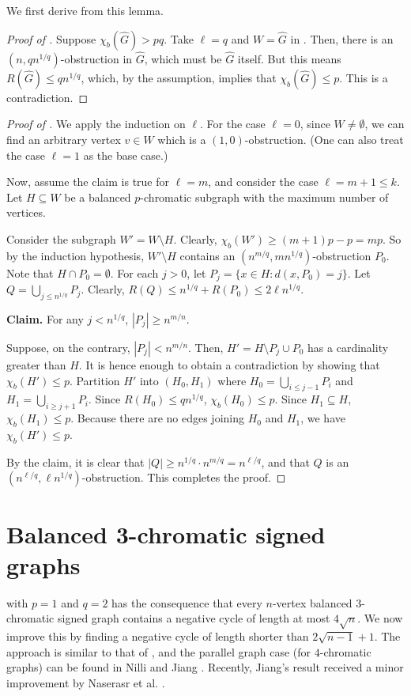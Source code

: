 \documentclass{article}
\begin{document}
We first derive  from this lemma.
\begin{proof}[Proof of ]
    Suppose $\chi_b(\widehat{G})>pq$. Take $\ell=q$ and $W=\widehat{G}$ in . Then, there is an $(n,qn^{1/q})$-obstruction in $\widehat{G}$, which must be $\widehat{G}$ itself. But this means $R(\widehat{G})\leq qn^{1/q}$, which, by the assumption, implies that $\chi_b(\widehat{G})\leq p$. This is a contradiction.
\end{proof}
\begin{proof}[Proof of ]
    We apply the induction on $\ell$. For the case $\ell=0$, since $W\neq \emptyset$, we can find an arbitrary vertex $v\in W$ which is a $(1,0)$-obstruction. (One can also treat the case $\ell =1$ as the base case.)

    Now, assume the claim is true for $\ell=m$, and consider the case $\ell=m+1\leq k$. Let $H\subseteq W$ be a balanced $p$-chromatic subgraph with the maximum number of vertices. %

    Consider the subgraph $W'=W\setminus H$. Clearly, $\chi_b(W')\geq (m+1)p-p=mp$. So by the induction hypothesis, $W'\setminus H$ contains an $(n^{m/q},mn^{1/q})$-obstruction $P_0$. Note that $H\cap P_0=\emptyset$. For each $j>0$, let $P_j=\{x\in H: d(x,P_0)=j\}$. Let $Q=\bigcup_{j\leq n^{1/q}}P_j$. Clearly, $R(Q)\leq n^{1/q}+R(P_0)\leq 2\ell n^{1/q}.$

    \textbf{Claim.} For any $j< n^{1/q}$, $|P_j|\geq n^{m/n}$. 

    Suppose, on the contrary, $|P_j|< n^{m/n}$. Then, $H'=H\setminus P_j\cup P_0$ has a cardinality greater than $H$. It is hence enough to obtain a contradiction by showing that $\chi_b(H')\leq p$. Partition $H'$ into $(H_0,H_1)$ where $H_0=\bigcup_{i\leq j-1}P_i$ and $H_1=\bigcup_{i\geq j+1}P_i$. Since $R(H_0)\leq qn^{1/q}$, $\chi_b(H_0)\leq p$. Since $H_1\subseteq H$, $\chi_b(H_1)\leq p$. Because there are no edges joining $H_0$ and $H_1$, we have $\chi_b(H')\leq p$.

    By the claim, it is clear that $|Q|\geq n^{1/q}\cdot n^{m/q}=n^{\ell/q}$, and that $Q$ is an $(n^{\ell/q}, \ell n^{1/q})$-obstruction. This completes the proof.
\end{proof}

\section{Balanced 3-chromatic signed graphs}
 with $p=1$ and $q=2$ has the consequence that every $n$-vertex balanced $3$-chromatic signed graph contains a negative cycle of length at most $4\sqrt{n}$. We now improve this by finding a negative cycle of length shorter than $2\sqrt{n-1}+1$. The approach is similar to that of , and the parallel graph case (for $4$-chromatic graphs) can be found in Nilli \cite{N99} and Jiang \cite{J01}. Recently, Jiang's result received a minor improvement by Naserasr et al. \cite{NWZpc}.
\end{document}
